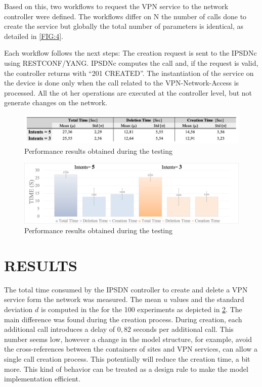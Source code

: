 \documentclass[conference]{IEEEtran}
\begin{document}
Based on this, two workflows to request the VPN service to the network controller were defined. The workflows differ on N the number of calls done to create the service but globally the total number of parameters is identical, as detailed in \cref{FIG:4}.

Each workflow follows the next steps:  The creation request is sent to the IPSDNc using RESTCONF/YANG. IPSDNc computes the call and, if the request is valid, the controller returns with “201 CREATED”. The instantiation of the service on the device is done only when the call related to the VPN-Network-Access is processed. All the ot her operations are executed at the controller level, but not generate changes on the network. 

\begin{figure}
	\centering
		\includegraphics[width=\linewidth]{figure51.png}
	\caption{Performance results obtained during the testing}
	\label{FIG:5}
\end{figure}

\begin{figure}
	\centering
		\includegraphics[width=\linewidth]{figure62.png}
	\caption{Performance results obtained during the testing}
	\label{FIG:5}
\end{figure}

\section{RESULTS}
\label{sect:resul}

The total time consumed by the IPSDN controller to create and delete a VPN service form the network was measured. The mean $u$ values and the standard deviation $d$ is computed in the for the 100 experiments as depicted in \cref{FIG:5}. The main difference was found during the creation process. During creation, each additional call introduces a delay of $0,82$ seconds per additional call. This number seems low, however a change in the model structure, for example, avoid the cross-references between the containers of sites and VPN services, can allow a single call creation process. This potentially will reduce the creation time, a bit more. This kind of behavior can be treated as a design rule to make the model implementation efficient. 
\end{document}

